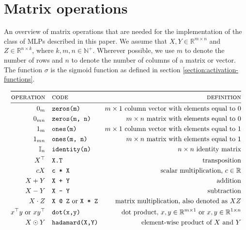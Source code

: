 \documentclass{article}
\newcommand{\Reals}{\mathbb{R}}
\begin{document}
\section{Matrix operations} \label{section:matrix_operations}
\begin{table}[H]
\centering
\caption{An overview of matrix operations that are needed for the implementation of the class of MLPs described in this paper. We assume that $X,Y \in \Reals^{m \times n}$ and $Z \in \Reals^{n \times k}$, where $k, m, n \in \mathbb{N}^{+}$. Wherever possible, we use $m$
to denote the number of rows and $n$ to denote the number of columns of a matrix or vector.
The function $\sigma$ is the sigmoid function as defined in section \ref{section:activation-functions}.
}
\label{table:matrix-operations}
{
\small
\begin{align*}
\toprule
    \textsc{operation} &\quad \textsc{code} & \textsc{definition}
    \\
    \midrule
    0_{m} &\quad \texttt{zeros(m)} & \text{$m \times 1$ column vector with elements equal to 0}
    \\
    0_{mn} &\quad \texttt{zeros(m, n)} & \text{$m \times n$ matrix with elements equal to 0}
    \\
    1_{m} &\quad \texttt{ones(m)} & \text{$m \times 1$ column vector with elements equal to 1}
    \\
    1_{mn} &\quad \texttt{ones(m, n)} & \text{$m \times n$ matrix with elements equal to 1} 
    \\
    \mathbb{I}_n &\quad \texttt{identity(n)} & \text{$n \times n$ identity matrix} 
    \\
    X^\top &\quad \texttt{X.T} & \text{transposition}
    \\
    cX &\quad \texttt{c * X} & \text{scalar multiplication, $c \in \Reals$}
    \\
    X + Y &\quad \texttt{X + Y} & \text{addition}
    \\
    X - Y &\quad \texttt{X - Y} & \text{subtraction}
    \\
    X \cdot Z &\quad \texttt{X @ Z} \text{ or } \texttt{X * Z} 
    & \text{matrix multiplication, also denoted as $XZ$}
    \\
    x^\top y \text{ or } x y^\top &\quad \texttt{dot(x,y)} & \text{dot product, } x,y \in \Reals^{m \times 1} \text{ or } x,y \in \Reals^{1 \times n}
    \\
    X \odot Y &\quad \texttt{hadamard(X,Y)} & \text{element-wise product of $X$ and $Y$}
    \\

\end{align*}}
\end{table}
\end{document}
